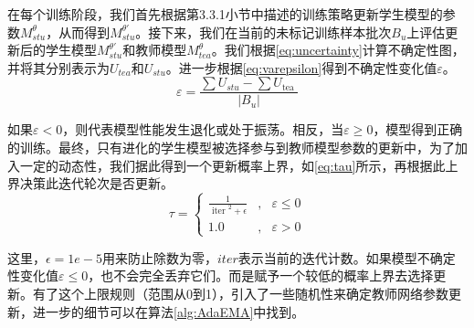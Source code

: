 \documentclass[lang=chs, degree=master, blindreview=false, adobe=false]{yanputhesis}
\begin{document}
在每个训练阶段，我们首先根据第3.3.1小节中描述的训练策略更新学生模型的参数$M^{\theta}_{stu}$，从而得到$M^{\theta'}_{stu}$。接下来，我们在当前的未标记训练样本批次$B_u$上评估更新后的学生模型$M^{\theta'}_{stu}$和教师模型$M^{\theta}_{tea}$。我们根据\ref{eq:uncertainty}计算不确定性图，并将其分别表示为$U_{tea}$和$U_{stu}$。进一步根据\ref{eq:varepsilon}得到不确定性变化值$\varepsilon$。
\begin{equation}
  \label{eq:varepsilon}
  \varepsilon=\frac{\sum U_{s t u}-\sum U_{\text {tea }}}{\left|B_{u}\right|}
\end{equation}

如果$\varepsilon < 0$，则代表模型性能发生退化或处于振荡。相反，当$\varepsilon \geqslant 0$，模型得到正确的训练。最终，只有进化的学生模型被选择参与到教师模型参数的更新中，为了加入一定的动态性，我们据此得到一个更新概率上界，如\autoref{eq:tau}所示，再根据此上界决策此迭代轮次是否更新。
\begin{equation}
  \label{eq:tau}
  \tau=\left\{\begin{array}{ccc}
    \frac{1}{\text { iter }^{2}+\epsilon} & , & \varepsilon \leq 0 \\
    1.0 & , & \varepsilon>0
    \end{array}\right.
\end{equation}

这里，$\epsilon=1e-5$用来防止除数为零，$iter$表示当前的迭代计数。如果模型不确定性变化值$\varepsilon \leqslant 0$，也不会完全丢弃它们。而是赋予一个较低的概率上界去选择更新。有了这个上限规则（范围从0到1），引入了一些随机性来确定教师网络参数更新，进一步的细节可以在算法\ref{alg:AdaEMA}中找到。
\end{document}
